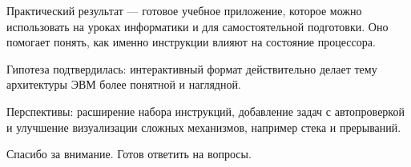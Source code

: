 \documentclass[12pt,a4paper]{article}
\begin{document}
Практический результат --- готовое учебное приложение, которое можно использовать на уроках информатики и для самостоятельной подготовки. Оно помогает понять, как именно инструкции влияют на состояние процессора.

Гипотеза подтвердилась: интерактивный формат действительно делает тему архитектуры ЭВМ более понятной и наглядной.

Перспективы: расширение набора инструкций, добавление задач с автопроверкой и улучшение визуализации сложных механизмов, например стека и прерываний.

Спасибо за внимание. Готов ответить на вопросы.
\end{document}
